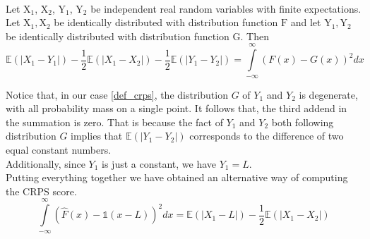 \\
\begin{lemma}
    Let $\mathrm{X}_1$, $\mathrm{X}_2$, $\mathrm{Y}_1$, $\mathrm{Y}_2$ be independent real random variables with finite expectations. Let $\mathrm{X}_1,\mathrm{X}_2$ be identically distributed with distribution function $\mathrm{F}$ and let $\mathrm{Y}_1,\mathrm{Y}_2$ be identically distributed with distribution function $\mathrm{G}$. Then
   \begin{equation}
    \mathbb{E}(|X_1-Y_1|)-\frac{1}{2}\mathbb{E}(|X_1-X_2|)-\frac{1}{2}\mathbb{E}(|Y_1-Y_2|)=\int\limits_{-\infty}^{\infty}\left(F(x)-G(x)\right)^2dx
\end{equation}
\end{lemma}
Notice that, in our case  \ref{def_crps}, the distribution $G$ of $Y_1$ and $Y_2$ is degenerate, with all probability mass on a single point.
It follows that, the third addend in the summation is zero. That is because the fact of $Y_1$ and $Y_2$ both following distribution $G$ implies that $\mathbb{E}(|Y_1-Y_2|)$ corresponds to the difference of two equal constant numbers.
\\
Additionally, since $Y_1$ is just a constant, we have $Y_1=L$.
\\
Putting everything together we have obtained an alternative way of computing the CRPS score.
\begin{equation}
    \int\limits_{-\infty}^{\infty}\left(\hat{F}(x)-\mathbb{1}(x-L) \right)^2 dx=\mathbb{E}(|X_1-L|)-\frac{1}{2}\mathbb{E}(|X_1-X_2|)
\end{equation}
\\

